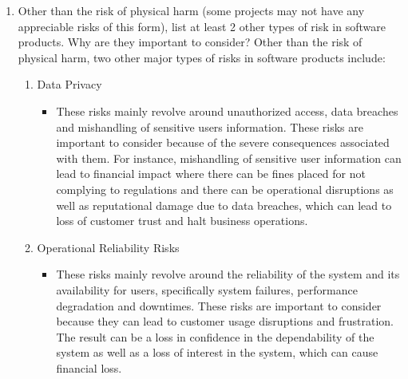 \documentclass{article}
\begin{document}
\begin{enumerate}
    \item Other than the risk of physical harm (some projects may not have any
    appreciable risks of this form), list at least 2 other types of risk in
    software products. Why are they important to consider?
    Other than the risk of physical harm, two other major types of risks in software products include:
    \begin{enumerate}
        \item Data Privacy
        \begin{itemize}
            \item These risks mainly revolve around unauthorized access, data breaches and mishandling of sensitive users information. These risks are important to consider because of the severe consequences associated with them. For instance, mishandling of sensitive user information can lead to financial impact where there can be fines placed for not complying to regulations and there can be operational disruptions as well as reputational damage due to data breaches, which can lead to loss of customer trust and halt business operations.
        \end{itemize}
        \item Operational Reliability Risks
        \begin{itemize}
            \item These risks mainly revolve around the reliability of the system and its availability for users, specifically system failures, performance degradation and downtimes. These risks are important to consider because they can lead to customer usage disruptions and frustration. The result can be a loss in confidence in the dependability of the system as well as a loss of interest in the system, which can cause financial loss.
        \end{itemize}
    \end{enumerate}
    
\end{enumerate}
\end{document}

